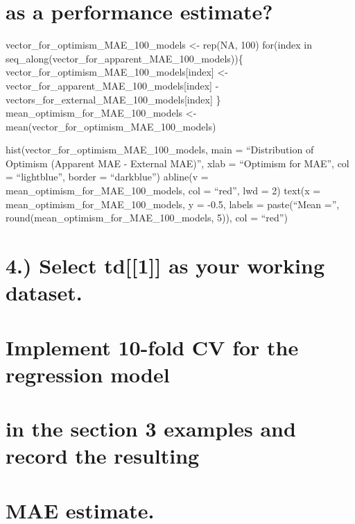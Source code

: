 \documentclass[
  letterpaper,
  DIV=11,
  numbers=noendperiod]{scrreprt}
\begin{document}
\chapter{as a performance estimate?}\label{as-a-performance-estimate}

vector\_for\_optimism\_MAE\_100\_models \textless- rep(NA, 100)
for(index in seq\_along(vector\_for\_apparent\_MAE\_100\_models))\{
vector\_for\_optimism\_MAE\_100\_models{[}index{]} \textless-
vector\_for\_apparent\_MAE\_100\_models{[}index{]} -
vectors\_for\_external\_MAE\_100\_models{[}index{]} \}
mean\_optimism\_for\_MAE\_100\_models \textless-
mean(vector\_for\_optimism\_MAE\_100\_models)

hist(vector\_for\_optimism\_MAE\_100\_models, main = ``Distribution of
Optimism (Apparent MAE - External MAE)'', xlab = ``Optimism for MAE'',
col = ``lightblue'', border = ``darkblue'') abline(v =
mean\_optimism\_for\_MAE\_100\_models, col = ``red'', lwd = 2) text(x =
mean\_optimism\_for\_MAE\_100\_models, y = -0.5, labels = paste(``Mean
='', round(mean\_optimism\_for\_MAE\_100\_models, 5)), col = ``red'')


\chapter{4.) Select td{[}{[}1{]}{]} as your working
dataset.}\label{select-td1-as-your-working-dataset.}


\chapter{Implement 10-fold CV for the regression
model}\label{implement-10-fold-cv-for-the-regression-model}


\chapter{in the section 3 examples and record the
resulting}\label{in-the-section-3-examples-and-record-the-resulting}


\chapter{MAE estimate.}\label{mae-estimate.}
\end{document}
